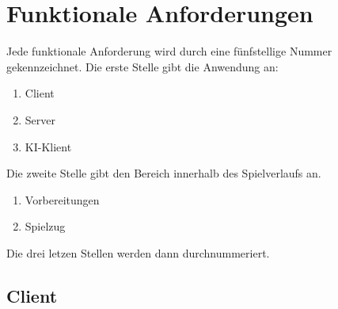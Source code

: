 \documentclass[a4paper,10pt]{article}
\begin{document}
\section{Funktionale Anforderungen}
Jede funktionale Anforderung wird durch eine fünfstellige Nummer gekennzeichnet. Die erste Stelle gibt die Anwendung an:
\begin{enumerate}
\item Client
\item Server
\item KI-Klient
\end{enumerate}
Die zweite Stelle gibt den Bereich innerhalb des Spielverlaufs an.
\begin{enumerate}
\item Vorbereitungen
\item Spielzug
\end{enumerate}
Die drei letzen Stellen werden dann durchnummeriert.
\subsection{Client}
\end{document}
